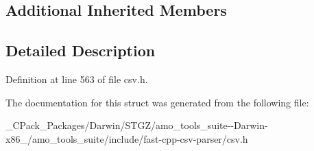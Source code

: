 \subsection*{Additional Inherited Members}


\subsection{Detailed Description}


Definition at line 563 of file csv.\+h.



The documentation for this struct was generated from the following file\+:\begin{DoxyCompactItemize}
\item 
\+\_\+\+C\+Pack\+\_\+\+Packages/\+Darwin/\+S\+T\+G\+Z/amo\+\_\+tools\+\_\+suite-\/-\/\+Darwin-\/x86\+\_/amo\+\_\+tools\+\_\+suite/include/fast-\/cpp-\/csv-\/parser/csv.\+h\end{DoxyCompactItemize}
